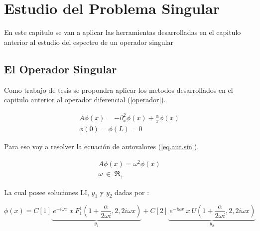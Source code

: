 \chapter{Estudio del Problema Singular}

En este capitulo se van a aplicar las herramientas desarrolladas en el capitulo anterior al estudio del espectro de un operador singular

\section{El Operador Singular}

Como trabajo de tesis se propondra aplicar los metodos desarrollados en el capitulo anterior al operador diferencial (\ref{operador}).

\begin{equation}
\begin{array}{c}
    A \phi (x) = - \partial ^2 _x  \phi(x) + \frac{\alpha}{x} \phi(x) \\
    \phi(0) = \phi(L) = 0 
\end{array}
\label{operador}
\end{equation}

Para eso voy a resolver la ecuación de autovalores (\ref{eq.aut.sin}).

\begin{equation}
\begin{array}{c}
    A  \phi (x)  =   \omega ^2 \phi (x) \\ 
    \omega \ \in \ \mathfrak{R} _+
\end{array}
\label{eq.aut.sin}
\end{equation}




La cual posee soluciones LI, $ y_1 $ y $ y_2 $ dadas por :

\begin{equation}
    \phi (x) = 
    C[1]
    \underbrace{
     \ e ^{-i \omega x} \ x \ F _{1} ^{1} (1+\frac{ \alpha}{2 \omega i },2,2 i \omega x) } _ {y_1}
    + C[2] \underbrace{ \ e^{-i \omega x } \ x \ U (1+\frac{ \alpha}{2 \omega i },2,2 i \omega x) } _{y_2} 
\end{equation}




